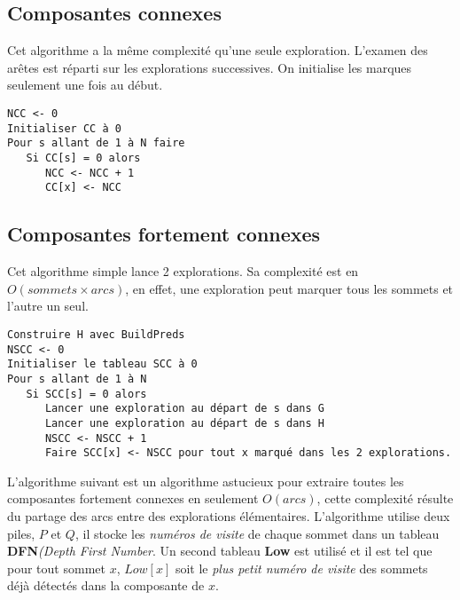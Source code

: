 \documentclass{article}
\begin{document}
\subsection{Composantes connexes}

\noindent Cet algorithme a la même complexité qu'une seule exploration. L'examen des arêtes est réparti sur les explorations successives. On initialise les marques seulement une 
fois au début. 
\begin{verbatim}
NCC <- 0
Initialiser CC à 0
Pour s allant de 1 à N faire
   Si CC[s] = 0 alors
      NCC <- NCC + 1
      CC[x] <- NCC
\end{verbatim}

\subsection{Composantes fortement connexes}

\noindent Cet algorithme simple lance 2 explorations. Sa complexité est en $O(sommets \times arcs)$, en effet, une exploration peut marquer tous les sommets et l'autre un seul.
\begin{verbatim}
Construire H avec BuildPreds
NSCC <- 0
Initialiser le tableau SCC à 0
Pour s allant de 1 à N
   Si SCC[s] = 0 alors
      Lancer une exploration au départ de s dans G
      Lancer une exploration au départ de s dans H
      NSCC <- NSCC + 1
      Faire SCC[x] <- NSCC pour tout x marqué dans les 2 explorations.
\end{verbatim}

\noindent L'algorithme suivant est un algorithme astucieux pour extraire toutes les composantes fortement connexes en seulement $O(arcs)$, cette complexité résulte du 
partage des arcs entre des explorations élémentaires. L'algorithme utilise deux piles, $P$ et $Q$, il stocke les \textit{numéros de visite} de chaque sommet dans un tableau 
\textbf{DFN}\textit{(Depth First Number}. Un second tableau \textbf{Low} est utilisé et il est tel que pour tout sommet $x$, $Low[x]$ soit le \textit{plus petit numéro de 
visite} des sommets déjà détectés dans la composante de $x$.
\end{document}
